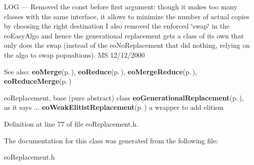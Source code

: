 LOG --- Removed the const before first argument: though it makes too many classes with the same interface, it allows to minimize the number of actual copies by choosing the right destination I also removed the enforced \char`\"{}swap\char`\"{} in the eo\-Easy\-Algo and hence the generational replacement gets a class of its own that only does the swap (instead of the eo\-No\-Replacement that did nothing, relying on the algo to swap popualtions). MS 12/12/2000

\begin{Desc}
\item[See also:]{\bf eo\-Merge}{\rm (p.\,\pageref{classeo_merge})}, {\bf eo\-Reduce}{\rm (p.\,\pageref{classeo_reduce})}, {\bf eo\-Merge\-Reduce}{\rm (p.\,\pageref{classeo_merge_reduce})}, {\bf eo\-Reduce\-Merge}{\rm (p.\,\pageref{classeo_reduce_merge})}\end{Desc}
eo\-Replacement, base (pure abstract) class {\bf eo\-Generational\-Replacement}{\rm (p.\,\pageref{classeo_generational_replacement})}, as it says ... {\bf eo\-Weak\-Elitist\-Replacement}{\rm (p.\,\pageref{classeo_weak_elitist_replacement})} a wrapper to add elitism 



Definition at line 77 of file eo\-Replacement.h.

The documentation for this class was generated from the following file:\begin{CompactItemize}
\item 
eo\-Replacement.h\end{CompactItemize}
